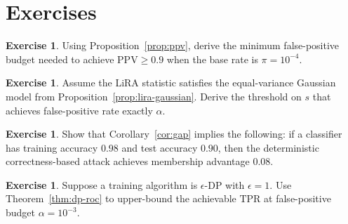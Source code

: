 \documentclass[11pt]{article}
\theoremstyle{definition}
\newtheorem{exercise}[theorem]{Exercise}
\newcommand{\1}{\mathbf{1}}
\newcommand{\TPR}{\mathrm{TPR}}
\newcommand{\PPV}{\mathrm{PPV}}
\begin{document}
\section{Exercises}

\begin{exercise}
Using Proposition~\ref{prop:ppv}, derive the minimum false-positive budget needed to achieve $\PPV \ge 0.9$ when the base rate is $\pi = 10^{-4}$.
\end{exercise}

\begin{exercise}
Assume the LiRA statistic satisfies the equal-variance Gaussian model from Proposition~\ref{prop:lira-gaussian}. Derive the threshold on $s$ that achieves false-positive rate exactly $\alpha$.
\end{exercise}

\begin{exercise}
Show that Corollary~\ref{cor:gap} implies the following: if a classifier has training accuracy $0.98$ and test accuracy $0.90$, then the deterministic correctness-based attack achieves membership advantage $0.08$.
\end{exercise}

\begin{exercise}
Suppose a training algorithm is $\epsilon$-DP with $\epsilon = 1$. Use Theorem~\ref{thm:dp-roc} to upper-bound the achievable $\TPR$ at false-positive budget $\alpha = 10^{-3}$.
\end{exercise}
\end{document}
